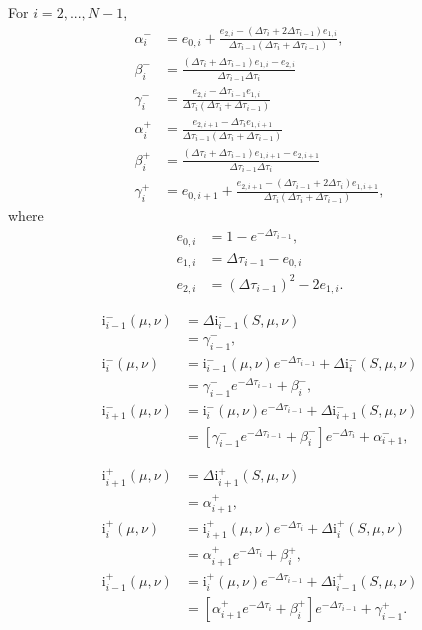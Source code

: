 \documentclass[12pt]{article}
\begin{document}
For $i = 2, ..., N - 1$,
\begin{align*}
\alpha_i^-
&=
e_{0, i} +
\frac{e_{2, i} - (\Delta\tau_i + 2\Delta\tau_{i - 1}) e_{1, i}}
     {\Delta\tau_{i - 1} (\Delta\tau_i + \Delta\tau_{i - 1})},
\\ \beta_i^-
&=
\frac{(\Delta\tau_i + \Delta\tau_{i - 1}) e_{1, i} - e_{2, i}}
     {\Delta\tau_{i - 1} \Delta\tau_i}
\\ \gamma_i^-
&=
\frac{e_{2, i} - \Delta\tau_{i - 1} e_{1, i}}
     {\Delta\tau_i (\Delta\tau_i + \Delta\tau_{i - 1})}
\\ \alpha_i^+
&=
\frac{e_{2, i + 1} - \Delta\tau_i e_{1, i + 1}}
     {\Delta\tau_{i - 1} (\Delta\tau_i + \Delta\tau_{i - 1})}
\\ \beta_i^+
&=
\frac{(\Delta\tau_i + \Delta\tau_{i - 1}) e_{1, i + 1} - e_{2, i + 1}}
     {\Delta\tau_{i - 1} \Delta\tau_i}
\\ \gamma_i^+
&=
e_{0, i + 1} +
\frac{e_{2, i + 1} - (\Delta\tau_{i - 1} + 2\Delta\tau_i) e_{1, i + 1}}
     {\Delta\tau_i (\Delta\tau_i + \Delta\tau_{i - 1})},
\end{align*}
where
\begin{align*}
e_{0, i}
&=
1 - e^{-\Delta\tau_{i - 1}},
\\ e_{1, i}
&=
\Delta\tau_{i - 1} - e_{0, i}
\\ e_{2, i}
&=
(\Delta\tau_{i - 1})^2 - 2 e_{1, i}.
\end{align*}

\begin{align*}
\text{i}_{i - 1}^- (\mu, \nu)
&=
\Delta\text{i}_{i - 1}^- (S, \mu, \nu)
\\ &=
\gamma_{i - 1}^-,
\\ \text{i}_{i}^- (\mu, \nu)
&=
\text{i}_{i - 1}^- (\mu, \nu) e^{-\Delta\tau_{i - 1}} +
    \Delta\text{i}_{i}^- (S, \mu, \nu)
\\ &=
\gamma_{i - 1}^- e^{-\Delta\tau_{i - 1}} + \beta_{i}^-,
\\ \text{i}_{i + 1}^- (\mu, \nu)
&=
\text{i}_{i}^- (\mu, \nu) e^{-\Delta\tau_{i - 1}} +
    \Delta\text{i}_{i + 1}^- (S, \mu, \nu)
\\ &=
[\gamma_{i - 1}^- e^{-\Delta\tau_{i - 1}} + \beta_{i}^-] e^{-\Delta\tau_{i}} +
    \alpha_{i + 1}^-,
\end{align*}

\begin{align*}
\text{i}_{i + 1}^+ (\mu, \nu)
&=
\Delta\text{i}_{i + 1}^+ (S, \mu, \nu)
\\ &=
\alpha_{i + 1}^+,
\\ \text{i}_{i}^+ (\mu, \nu)
&=
\text{i}_{i + 1}^+ (\mu, \nu) e^{-\Delta\tau_{i}} +
    \Delta\text{i}_{i}^+ (S, \mu, \nu)
\\ &=
\alpha_{i + 1}^+ e^{-\Delta\tau_{i}} + \beta_{i}^+,
\\ \text{i}_{i - 1}^+ (\mu, \nu)
&=
\text{i}_{i}^+ (\mu, \nu) e^{-\Delta\tau_{i - 1}} +
    \Delta\text{i}_{i - 1}^+ (S, \mu, \nu)
\\ &=
[\alpha_{i + 1}^+ e^{-\Delta\tau_{i}} + \beta_{i}^+] e^{-\Delta\tau_{i - 1}} +
    \gamma_{i - 1}^+.
\end{align*}
\end{document}
